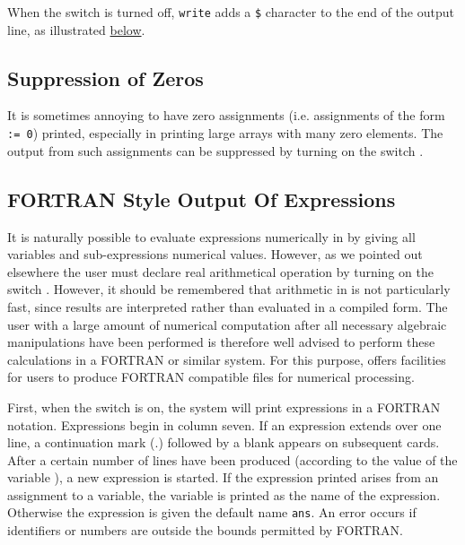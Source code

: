 When the switch  is turned off,
\texttt{write} adds a \texttt{\$} character to the end of the output
line, as illustrated \hyperlink{switch:NAT}{below}.

\subsection{Suppression of Zeros}
\hypertarget{switch:NERO}{}

It is sometimes annoying to have zero assignments (i.e. assignments of the
form \texttt{ := 0}) printed, especially in printing large arrays
with many zero elements.  The output from such assignments can be
suppressed by turning on the switch .

\subsection{{FORTRAN} Style Output Of Expressions}

It is naturally possible to evaluate expressions numerically in {\REDUCE} by
giving all variables and sub-expressions numerical values. However, as we
pointed out elsewhere the user must declare real arithmetical operation by
turning on the switch .  However, it should be
remembered that arithmetic in {\REDUCE} is not particularly fast, since
results are interpreted rather than evaluated in a compiled form. The user
with a large amount of numerical computation after all necessary algebraic
manipulations have been performed is therefore well advised to perform
these calculations in a FORTRAN or similar system.  For
this purpose, {\REDUCE} offers facilities for users to produce FORTRAN
compatible files for numerical processing.

\hypertarget{reserved:CARD_NO}{}
\hypertarget{switch:FORT}{}
First, when the switch  is on, the system will
print expressions in a FORTRAN notation.  Expressions begin in column
seven.  If an expression extends over one line, a continuation mark (.)
followed by a blank appears on subsequent cards.  After a certain number
of lines have been produced (according to the value of the variable
),
a new expression is started.  If the
expression printed arises from an assignment to a variable, the variable
is printed as the name of the expression.  Otherwise the expression is
given the default name \texttt{ans}.  An error occurs if identifiers or
numbers are outside the bounds permitted by FORTRAN.

